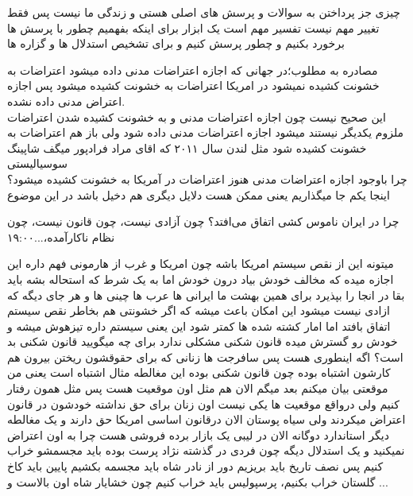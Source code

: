 \documentclass{article}
\begin{document}
	 چیزی جز پرداختن به سوالات و پرسش های اصلی هستی و زندگی ما نیست پس فقط تغییر مهم نیست تفسیر مهم است
		 یک ابزار برای اینکه بفهمیم چطور با پرسش ها برخورد بکنیم و چطور پرسش کنیم و برای تشخیص استدلال ها و گزاره ها
		
		مصادره به مطلوب؛در جهانی که اجازه اعتراضات مدنی داده میشود اعتراضات به خشونت کشیده نمیشود در امریکا اعتراضات به خشونت کشیده میشود پس اجازه اعتراض مدنی داده نشده.\\
		این صحیح نیست چون اجازه اعتراضات مدنی و به خشونت کشیده شدن اعتراضات ملزوم یکدیگر نیستند میشود اجازه اعتراضات مدنی داده شود ولی باز هم اعتراضات به خشونت کشیده شود مثل لندن سال ۲۰۱۱ که اقای مراد فرادپور میگف شاپینگ سوسیالیستی\\
		
 چرا باوجود اجازه اعتراضات مدنی هنوز اعتراضات در آمریکا به خشونت کشیده میشود؟ اینجا یکم جا میگذاریم یعنی ممکن هست دلایل دیگری هم دخیل باشد در این موضوع

	 چرا در ایران ناموس کشی اتفاق می‌افتد؟ چون آزادی نیست، چون قانون نیست، چون نظام ناکارآمده،...۱۹:۰۰
	
	
	 میتونه این از نقص سیستم امریکا باشه چون امریکا و غرب از هارمونی فهم داره این اجازه میده که مخالف خودش بیاد درون خودش اما به یک شرط که استحاله بشه باید بقا در انجا را بپذیرد برای همین بهشت ما ایرانی ها عرب ها چینی ها و هر جای دیگه که ازادی نیست میشود این امکان باعث میشه که اگر خشونتی هم بخاطر نقص سیستم اتفاق بافتد اما امار کشته شده ها کمتر شود این یعنی سیستم داره تیزهوش میشه و خودش رو گسترش میده
	 قانون شکنی مشکلی ندارد برای چه میگویید قانون شکنی بد است؟ اگه اینطوری هست پس سافرجت ها زنانی که برای حقوقشون ریختن
	بیرون هم کارشون اشتباه بوده چون قانون شکنی بوده این مغالطه مثال اشتباه است یعنی من موقعتی بیان میکنم بعد میگم الان هم مثل اون موقعیت
	هست پس مثل همون رفتار کنیم ولی درواقع موقعیت ها یکی نیست اون زنان برای حق نداشته خودشون در قانون اعتراض میکردند ولی سیاه پوستان الان
	درقانون اساسی امریکا حق دارند و یک مغالطه دیگر استاندارد دوگانه الان در لیبی یک بازار برده فروشی هست چرا به اون اعتراض نمیکنید و یک 
	استدلال دیگه چون فردی در گذشته نژاد پرست بوده باید مجسمشو خراب کنیم پس نصف تاریخ باید بریزیم دور از نادر شاه باید مجسمه بکشیم پایین
	باید کاخ گلستان خراب بکنیم، پرسپولیس باید خراب کنیم چون خشایار شاه اون بالاست و ...
	
\end{document}
